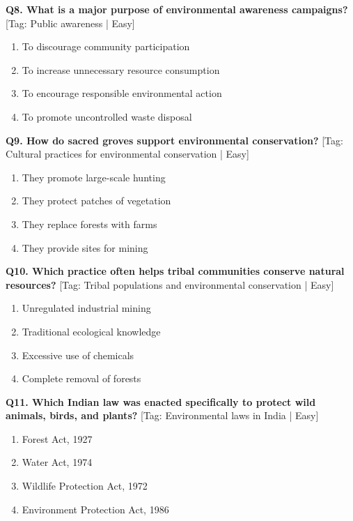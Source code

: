 \noindent\textbf{Q8. What is a major purpose of environmental awareness campaigns?} \hfill [Tag: Public awareness | Easy]
\begin{enumerate}[label=(\alph*),topsep=2pt,itemsep=1pt,partopsep=0pt,parsep=0pt]
    \item {To discourage community participation}
    \item {To increase unnecessary resource consumption}
    \item {To encourage responsible environmental action}
    \item {To promote uncontrolled waste disposal}
\end{enumerate}
\vspace{2mm}

\noindent\textbf{Q9. How do sacred groves support environmental conservation?} \hfill [Tag: Cultural practices for environmental conservation | Easy]
\begin{enumerate}[label=(\alph*),topsep=2pt,itemsep=1pt,partopsep=0pt,parsep=0pt]
    \item {They promote large-scale hunting}
    \item {They protect patches of vegetation}
    \item {They replace forests with farms}
    \item {They provide sites for mining}
\end{enumerate}
\vspace{2mm}

\noindent\textbf{Q10. Which practice often helps tribal communities conserve natural resources?} \hfill [Tag: Tribal populations and environmental conservation | Easy]
\begin{enumerate}[label=(\alph*),topsep=2pt,itemsep=1pt,partopsep=0pt,parsep=0pt]
    \item {Unregulated industrial mining}
    \item {Traditional ecological knowledge}
    \item {Excessive use of chemicals}
    \item {Complete removal of forests}
\end{enumerate}
\vspace{2mm}

\noindent\textbf{Q11. Which Indian law was enacted specifically to protect wild animals, birds, and plants?} \hfill [Tag: Environmental laws in India | Easy]
\begin{enumerate}[label=(\alph*),topsep=2pt,itemsep=1pt,partopsep=0pt,parsep=0pt]
    \item {Forest Act, 1927}
    \item {Water Act, 1974}
    \item {Wildlife Protection Act, 1972}
    \item {Environment Protection Act, 1986}
\end{enumerate}
\vspace{2mm}

